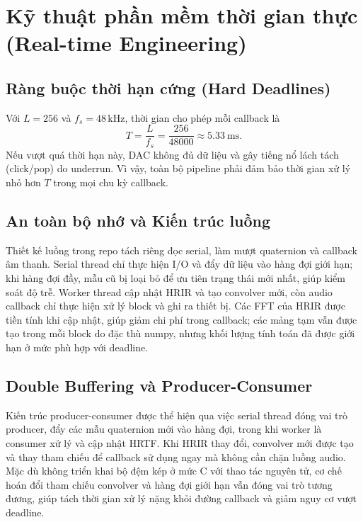\chapter{Kỹ thuật phần mềm thời gian thực (Real-time Engineering)}

\section{Ràng buộc thời hạn cứng (Hard Deadlines)}
Với $L=256$ và $f_s=48\,\text{kHz}$, thời gian cho phép mỗi callback là
\begin{equation}
    T = \frac{L}{f_s} = \frac{256}{48000} \approx \SI{5.33}{\milli\second}.
\end{equation}
Nếu vượt quá thời hạn này, DAC không đủ dữ liệu và gây tiếng nổ lách tách (click/pop) do underrun. Vì vậy, toàn bộ pipeline phải đảm bảo thời gian xử lý nhỏ hơn $T$ trong mọi chu kỳ callback.

\section{An toàn bộ nhớ và Kiến trúc luồng}
Thiết kế luồng trong repo tách riêng đọc serial, làm mượt quaternion và callback âm thanh. Serial thread chỉ thực hiện I/O và đẩy dữ liệu vào hàng đợi giới hạn; khi hàng đợi đầy, mẫu cũ bị loại bỏ để ưu tiên trạng thái mới nhất, giúp kiểm soát độ trễ. Worker thread cập nhật HRIR và tạo convolver mới, còn audio callback chỉ thực hiện xử lý block và ghi ra thiết bị. Các FFT của HRIR được tiền tính khi cập nhật, giúp giảm chi phí trong callback; các mảng tạm vẫn được tạo trong mỗi block do đặc thù numpy, nhưng khối lượng tính toán đã được giới hạn ở mức phù hợp với deadline.

\section{Double Buffering và Producer-Consumer}
Kiến trúc producer-consumer được thể hiện qua việc serial thread đóng vai trò producer, đẩy các mẫu quaternion mới vào hàng đợi, trong khi worker là consumer xử lý và cập nhật HRTF. Khi HRIR thay đổi, convolver mới được tạo và thay tham chiếu để callback sử dụng ngay mà không cần chặn luồng audio. Mặc dù không triển khai bộ đệm kép ở mức C với thao tác nguyên tử, cơ chế hoán đổi tham chiếu convolver và hàng đợi giới hạn vẫn đóng vai trò tương đương, giúp tách thời gian xử lý nặng khỏi đường callback và giảm nguy cơ vượt deadline.

